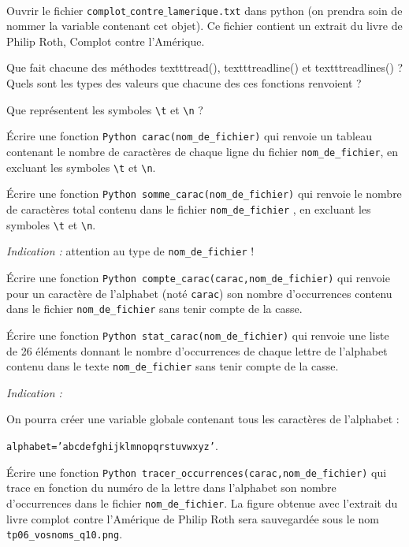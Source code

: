 \exer{[FIC-011]}
\setcounter{numques}{0}~\\

Ouvrir le fichier \texttt{complot$\_$contre$\_$lamerique.txt} dans python (on prendra soin de nommer la variable contenant cet objet). Ce fichier contient un extrait du livre de Philip Roth, Complot contre l'Amérique.

\question{} Que fait chacune des méthodes  texttt{read()}, texttt{readline()} et texttt{readlines()} ? Quels sont les types des valeurs que chacune des ces fonctions renvoient ? 

\question{} Que représentent les symboles \texttt{\textbackslash t} et \texttt{\textbackslash n} ?



\question{} \'Ecrire une fonction \texttt{Python}\, \texttt{carac(nom\_de\_fichier)} qui renvoie un tableau contenant le nombre de caractères de chaque ligne du fichier \texttt{nom\_de\_fichier}, en excluant les symboles \texttt{\textbackslash t} et \texttt{\textbackslash n}. 

\question{} \'Ecrire une fonction \texttt{Python}\, \texttt{somme\_carac(nom\_de\_fichier)} qui renvoie le nombre de caractères total contenu dans le fichier \texttt{nom\_de\_fichier} , en excluant les symboles \texttt{\textbackslash t} et \texttt{\textbackslash n}. 

\emph{Indication :} attention au type de \texttt{nom\_de\_fichier} !

\question{} \'Ecrire une fonction \texttt{Python}\, \texttt{compte\_carac(carac,nom\_de\_fichier)} qui renvoie pour un caractère de l'alphabet (noté \texttt{carac}) son nombre d'occurrences contenu dans le fichier \texttt{nom\_de\_fichier} sans tenir compte de la casse.

\question{} \'Ecrire une fonction \texttt{Python}\, \texttt{stat\_carac(nom\_de\_fichier)} qui renvoie une liste de 26 éléments donnant le nombre d'occurrences de chaque lettre de l'alphabet contenu dans le texte \texttt{nom\_de\_fichier} sans tenir compte de la casse.

\emph{Indication :}  

On pourra créer une variable globale contenant tous les caractères de l'alphabet :

 \texttt{alphabet='abcdefghijklmnopqrstuvwxyz'}. 

\question{ } \'Ecrire une fonction \texttt{Python}\, \texttt{tracer\_occurrences(carac,nom\_de\_fichier)} qui trace en fonction du numéro de la lettre dans l'alphabet son nombre d'occurrences dans le fichier \texttt{nom\_de\_fichier}. La figure obtenue avec l'extrait du livre complot contre l'Amérique de Philip Roth sera sauvegardée sous le nom \texttt{tp06\_vosnoms\_q10.png}.

